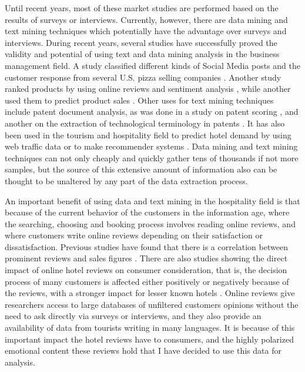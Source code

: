 \documentclass[review]{elsarticle}
\begin{document}
Until recent years, most of these market studies are performed based on the results of surveys or interviews. Currently, however, there are data mining and text mining techniques which potentially have the advantage over surveys and interviews. During recent years, several studies have successfully proved the validity and potential of using text and data mining analysis in the business management field. A study classified different kinds of Social Media posts and the customer response from several U.S. pizza selling companies \cite{he2013}. Another study ranked products by using online reviews and sentiment analysis \cite{liu2017149}, while another used them to predict product sales \cite{fan201790}. Other uses for text mining techniques include patent document analysis, as was done in a study on patent scoring \cite{nonaka2014}, and another on the extraction of technological terminology in patents \cite{nonaka2012}. It has also been used in the tourism and hospitality field to predict hotel demand by using web traffic data \cite{yang2014} or to make recommender systems \cite{loh2003}. Data mining and text mining techniques can not only cheaply and quickly gather tens of thousands if not more samples, but the source of this extensive amount of information also can be thought to be unaltered by any part of the data extraction process. 

An important benefit of using data and text mining in the hospitality field is that because of the current behavior of the customers in the information age, where the searching, choosing and booking process involves reading online reviews, and where customers write online reviews depending on their satisfaction or dissatisfaction. Previous studies have found that there is a correlation between prominent reviews and sales figures \cite{basuroy2003, ye2009}. There are also studies showing the direct impact of online hotel reviews on consumer consideration, that is, the decision process of many customers is affected either positively or negatively because of the reviews, with a stronger impact for lesser known hotels \cite{vermeulen2009}. Online reviews give researchers access to large databases of unfiltered customers opinions without the need to ask directly via surveys or interviews, and they also provide an availability of data from tourists writing in many languages. It is because of this important impact the hotel reviews have to consumers, and the highly polarized emotional content these reviews hold that I have decided to use this data for analysis.
\end{document}
